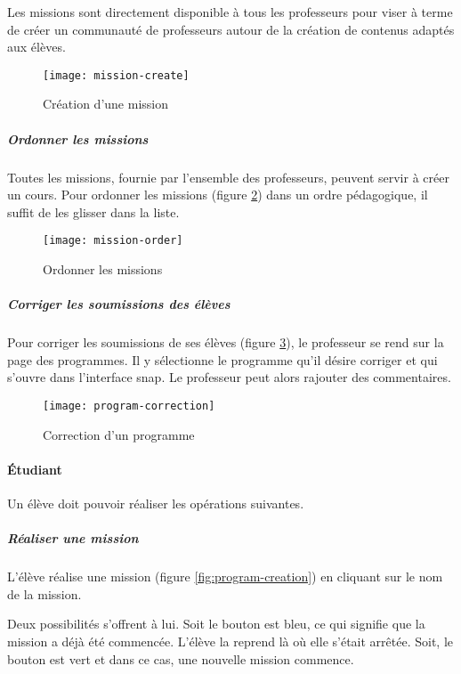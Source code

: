 \label{communaute}
Les missions sont directement disponible à tous les professeurs pour viser à terme de créer un communauté de professeurs autour de la création de contenus adaptés aux élèves.
\begin{figure}
  \begin{center}
    \texttt{[image: mission-create]}
    \caption{Création d'une mission}
    \label{fig:mission-create}
  \end{center}
\end{figure}

\subparagraph{Ordonner les missions} Toutes les missions, fournie par l'ensemble des professeurs, peuvent servir à créer un cours. Pour ordonner les \glspl{mission} (figure \ref{fig:mission-order}) dans un ordre pédagogique, il suffit de les glisser dans la liste.
\begin{figure}
  \begin{center}
    \texttt{[image: mission-order]}
    \caption{Ordonner les missions}
    \label{fig:mission-order}
  \end{center}
\end{figure}

\subparagraph{Corriger les soumissions des élèves} Pour corriger les soumissions de ses élèves (figure \ref{fig:program-correction}), le professeur se rend sur la page des programmes. Il y sélectionne le programme qu'il désire corriger et qui s'ouvre dans l'interface \gls{snap}. Le professeur peut alors rajouter des commentaires.
\begin{figure}
  \begin{center}
    \texttt{[image: program-correction]}
    \caption{Correction d'un programme}
    \label{fig:program-correction}
  \end{center}
\end{figure}

\paragraph{Étudiant}
Un élève doit pouvoir réaliser les opérations suivantes.

\subparagraph{Réaliser une mission} L'élève réalise une \gls{mission} (figure \ref{fig:program-creation}) en cliquant sur le nom de la \gls{mission}.

Deux possibilités s'offrent à lui. Soit le bouton est bleu, ce qui signifie que la \gls{mission} a déjà été commencée. L'élève la reprend là où elle s'était arrêtée. Soit, le bouton est vert et dans ce cas, une nouvelle \gls{mission} commence.

